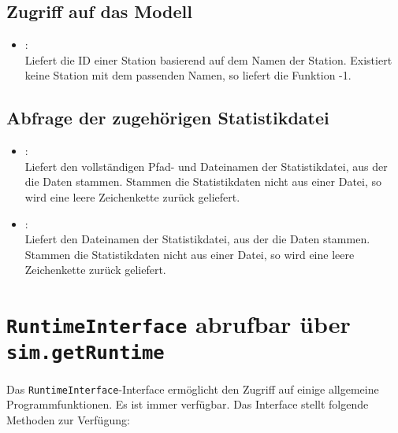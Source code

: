 \section{Zugriff auf das Modell}

\begin{itemize}

\item
{}:\\
Liefert die ID einer Station basierend auf dem Namen der Station.
Existiert keine Station mit dem passenden Namen, so liefert die Funktion -1.

\end{itemize}

\section{Abfrage der zugehörigen Statistikdatei}

\begin{itemize}

\item
{}:\\
Liefert den vollständigen Pfad- und Dateinamen der Statistikdatei, aus der die Daten stammen.
Stammen die Statistikdaten nicht aus einer Datei, so wird eine leere Zeichenkette zurück geliefert.

\item
{}:\\
Liefert den Dateinamen der Statistikdatei, aus der die Daten stammen.
Stammen die Statistikdaten nicht aus einer Datei, so wird eine leere Zeichenkette zurück geliefert.

\end{itemize}



\chapter{\texttt{RuntimeInterface} abrufbar über \texttt{sim.getRuntime}}

Das \texttt{RuntimeInterface}-Interface ermöglicht den Zugriff auf einige allgemeine Programmfunktionen.
Es ist immer verfügbar. Das Interface stellt folgende Methoden zur Verfügung:

